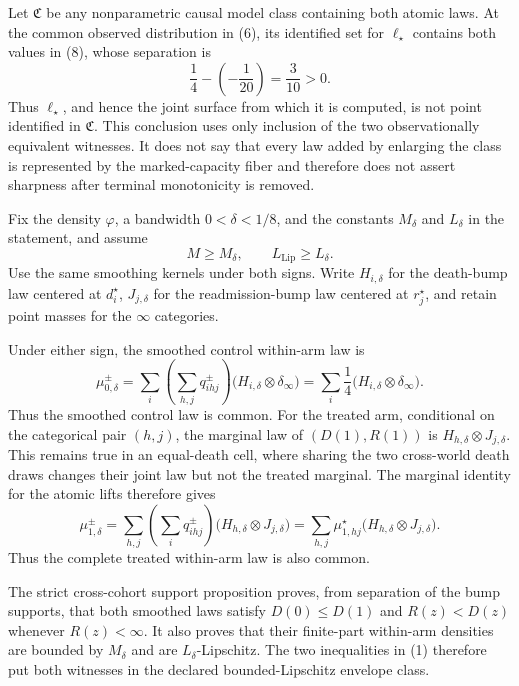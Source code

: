 Let \(\mathfrak C\) be any nonparametric causal model class containing both atomic laws.  At the common observed distribution in (6), its identified set for \(\ell_\star\) contains both values in (8), whose separation is
\[
 \frac14-\left(-\frac1{20}\right)=\frac3{10}>0. \tag{9}
\]
Thus \(\ell_\star\), and hence the joint surface from which it is computed, is not point identified in \(\mathfrak C\).  This conclusion uses only inclusion of the two observationally equivalent witnesses.  It does not say that every law added by enlarging the class is represented by the marked-capacity fiber and therefore does not assert sharpness after terminal monotonicity is removed.

Fix the density \(\varphi\), a bandwidth \(0<\delta<1/8\), and the constants \(M_\delta\) and \(L_\delta\) in the statement, and assume
\[
 M\geq M_\delta,\qquad L_{\mathrm{Lip}}\geq L_\delta. \tag{1}
\]
Use the same smoothing kernels under both signs.  Write \(H_{i,\delta}\) for the death-bump law centered at \(d_i^\star\), \(J_{j,\delta}\) for the readmission-bump law centered at \(r_j^\star\), and retain point masses for the \(\infty\) categories.

Under either sign, the smoothed control within-arm law is
\[
 \mu_{0,\delta}^{\pm}
 =\sum_i\left(\sum_{h,j}q^\pm_{ihj}\right)
 \bigl(H_{i,\delta}\otimes\delta_\infty\bigr)
 =\sum_i\frac14\bigl(H_{i,\delta}\otimes\delta_\infty\bigr). \tag{2}
\]
Thus the smoothed control law is common.  For the treated arm, conditional on the categorical pair \((h,j)\), the marginal law of \((D(1),R(1))\) is \(H_{h,\delta}\otimes J_{j,\delta}\).  This remains true in an equal-death cell, where sharing the two cross-world death draws changes their joint law but not the treated marginal.  The marginal identity for the atomic lifts therefore gives
\[
 \mu_{1,\delta}^{\pm}
 =\sum_{h,j}\left(\sum_iq^\pm_{ihj}\right)
 \bigl(H_{h,\delta}\otimes J_{j,\delta}\bigr)
 =\sum_{h,j}\mu_{1,hj}^\star
 \bigl(H_{h,\delta}\otimes J_{j,\delta}\bigr). \tag{3}
\]
Thus the complete treated within-arm law is also common.

The strict cross-cohort support proposition proves, from separation of the bump supports, that both smoothed laws satisfy \(D(0)\leq D(1)\) and \(R(z)<D(z)\) whenever \(R(z)<\infty\).  It also proves that their finite-part within-arm densities are bounded by \(M_\delta\) and are \(L_\delta\)-Lipschitz.  The two inequalities in (1) therefore put both witnesses in the declared bounded-Lipschitz envelope class.

